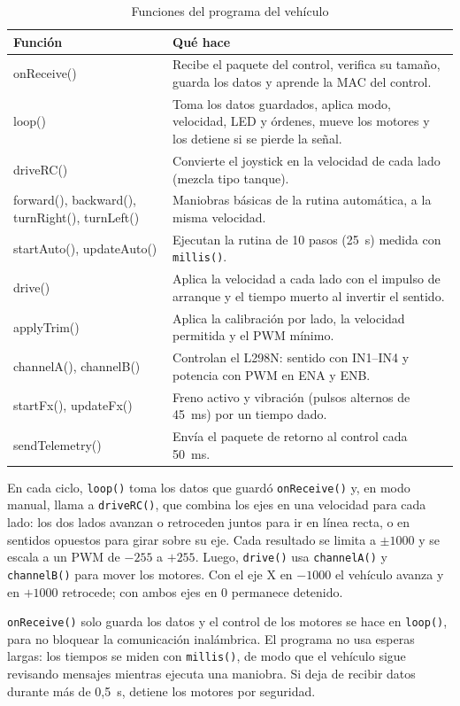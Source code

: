 \documentclass[journal]{IEEEtran}
\begin{document}
\begin{table}[t]
\centering
\caption{Funciones del programa del vehículo}
\label{tab:carro}
\begin{tabular}{@{}>{\ttfamily\raggedright}p{2.6cm}p{5.0cm}@{}}
\toprule
\textrm{Función} & Qué hace \\
\midrule
onReceive() & Recibe el paquete del control, verifica su tamaño, guarda los datos y aprende la MAC del control. \\
loop() & Toma los datos guardados, aplica modo, velocidad, LED y órdenes, mueve los motores y los detiene si se pierde la señal. \\
driveRC() & Convierte el joystick en la velocidad de cada lado (mezcla tipo tanque). \\
forward(), backward(), turnRight(), turnLeft() & Maniobras básicas de la rutina automática, a la misma velocidad. \\
startAuto(), updateAuto() & Ejecutan la rutina de 10 pasos (25~s) medida con \texttt{millis()}. \\
drive() & Aplica la velocidad a cada lado con el impulso de arranque y el tiempo muerto al invertir el sentido. \\
applyTrim() & Aplica la calibración por lado, la velocidad permitida y el PWM mínimo. \\
channelA(), channelB() & Controlan el L298N: sentido con IN1--IN4 y potencia con PWM en ENA y ENB. \\
startFx(), updateFx() & Freno activo y vibración (pulsos alternos de 45~ms) por un tiempo dado. \\
sendTelemetry() & Envía el paquete de retorno al control cada 50~ms. \\
\bottomrule
\end{tabular}
\end{table}

En cada ciclo, \texttt{loop()} toma los datos que guardó \texttt{onReceive()} y, en modo manual, llama a \texttt{driveRC()}, que combina los ejes en una velocidad para cada lado: los dos lados avanzan o retroceden juntos para ir en línea recta, o en sentidos opuestos para girar sobre su eje. Cada resultado se limita a $\pm1000$ y se escala a un PWM de $-255$ a $+255$. Luego, \texttt{drive()} usa \texttt{channelA()} y \texttt{channelB()} para mover los motores. Con el eje X en $-1000$ el vehículo avanza y en $+1000$ retrocede; con ambos ejes en 0 permanece detenido.

\texttt{onReceive()} solo guarda los datos y el control de los motores se hace en \texttt{loop()}, para no bloquear la comunicación inalámbrica. El programa no usa esperas largas: los tiempos se miden con \texttt{millis()}, de modo que el vehículo sigue revisando mensajes mientras ejecuta una maniobra. Si deja de recibir datos durante más de 0,5~s, detiene los motores por seguridad.
\end{document}
